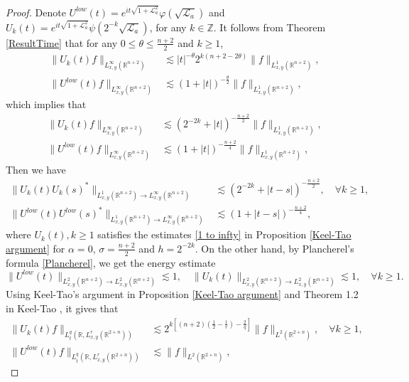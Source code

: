 \documentclass[a4paper,11pt, reqno]{amsart}
\numberwithin{equation}{section}
\theoremstyle{plain}
\theoremstyle{definition}
\theoremstyle{remark}
\begin{document}
\begin{proof} Denote $U^{low}(t)=e^{it\sqrt{1+\mathcal{L}^2_a}}\varphi(\sqrt{\mathcal{L}_a})$ and $U_k(t)=e^{it\sqrt{1+\mathcal{L}^2_a}}\psi(2^{-k}\sqrt{\mathcal{L}_a})$, for any $k\in\mathbb{Z}$.
It follows from Theorem \ref{ResultTime} that for any $0\leq \theta\leq \frac{n+2}{2}$ and $k\geq1$,
\begin{align*}
\|U_k(t)f\|_{L^\infty_{x,y}(\mathbb{R}^{n+2})}&\lesssim |t|^{-\theta}2^{k(n+2-2\theta)}\|f\|_{L^1_{x,y}(\mathbb{R}^{n+2})},\\
\|U^{low}(t)f\|_{L^\infty_{x,y}(\mathbb{R}^{n+2})}&\lesssim (1+|t|)^{-\frac{\theta}{2}}\|f\|_{L^1_{x,y}(\mathbb{R}^{n+2})},
\end{align*}
which implies that
\begin{align*}
\|U_k(t)f\|_{L^\infty_{x,y}(\mathbb{R}^{n+2})}&\lesssim (2^{-2k}+|t|)^{-\frac{n+2}{2}}\|f\|_{L^1_{x,y}(\mathbb{R}^{n+2})},\\
\|U^{low}(t)f\|_{L^\infty_{x,y}(\mathbb{R}^{n+2})}&\lesssim (1+|t|)^{-\frac{n+2}{4}}\|f\|_{L^1_{x,y}(\mathbb{R}^{n+2})},
\end{align*}
Then we have
\begin{align*}
\|U_k(t)U_k(s)^*\|_{L^1_{x,y}(\mathbb{R}^{n+2})\rightarrow L^\infty_{x,y}(\mathbb{R}^{n+2})}&\lesssim (2^{-2k}+|t-s|)^{-\frac{n+2}{2}},\quad \forall k\geq1,\\
\|U^{low}(t)U^{low}(s)^*\|_{L^1_{x,y}(\mathbb{R}^{n+2})\rightarrow L^\infty_{x,y}(\mathbb{R}^{n+2})}&\lesssim (1+|t-s|)^{-\frac{n+2}{4}},
\end{align*}
where $U_k(t),k\geq1$ satisfies the estimates \eqref{1 to infty} in Proposition \ref{Keel-Tao argument} for $\alpha=0$, $\sigma=\frac{n+2}{2}$ and $h=2^{-2k}$. 
On the other hand, by Plancherel's formula {\color{red} \eqref{Plancherel}}, we get the energy estimate
\begin{equation*}
\|U^{low}(t)\|_{L^2_{x,y}(\mathbb{R}^{n+2})\rightarrow L^2_{x,y}(\mathbb{R}^{n+2})}\lesssim 1,\quad \|U_k(t)\|_{L^2_{x,y}(\mathbb{R}^{n+2})\rightarrow L^2_{x,y}(\mathbb{R}^{n+2})}\lesssim 1,\quad \forall k\geq1.
\end{equation*}
Using Keel-Tao's argument in Proposition \ref{Keel-Tao argument} and Theorem 1.2 in Keel-Tao \cite{KT}, it gives that
\begin{align*}
\|U_k(t)f\|_{L_t^q(\mathbb{R},L^r_{x,y}(\mathbb{R}^{2+n}))}&\lesssim 2^{k[(n+2)(\frac{1}{2}-\frac{1}{r})-\frac{2}{q}]}\|f\|_{L^2(\mathbb{R}^{2+n})}, \quad\forall k\geq1,\\
\|U^{low}(t)f\|_{L_t^q(\mathbb{R},L^r_{x,y}(\mathbb{R}^{2+n}))}&\lesssim \|f\|_{L^2(\mathbb{R}^{2+n})},

\end{align*}
\end{proof}
\end{document}
